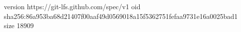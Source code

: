 version https://git-lfs.github.com/spec/v1
oid sha256:86a953ba68d21407f00aaf49d0569018a15f5362751fefaa9731e16a0025bad1
size 18909
